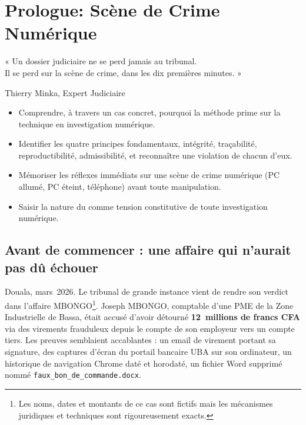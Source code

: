 
\chapter{Prologue: Scène de Crime Numérique}
\label{chap:prologue}

\epigraph{%
    « Un dossier judiciaire ne se perd jamais au tribunal.\\
    Il se perd sur la scène de crime, dans les dix premières minutes. »%
}{Thierry Minka, Expert Judiciaire}


\begin{boxobjectifs}
\begin{itemize}
    \item Comprendre, à travers un cas concret, pourquoi la méthode prime
          sur la technique en investigation numérique.
    \item Identifier les quatre principes fondamentaux, intégrité,
          traçabilité, reproductibilité, admissibilité, et reconnaître
          une violation de chacun d'eux.
    \item Mémoriser les réflexes immédiats sur une scène de crime numérique
          (PC allumé, PC éteint, téléphone) avant toute manipulation.
    \item Saisir la nature du  comme tension
          constitutive de toute investigation numérique.
\end{itemize}
\end{boxobjectifs}

\bigskip

\section*{Avant de commencer : une affaire qui n'aurait pas dû échouer}

Douala, mars~2026. Le tribunal de grande instance vient de rendre son verdict
dans l'affaire MBONGO\footnote{Les noms, dates et montants de ce cas sont
fictifs mais les mécanismes juridiques et techniques sont rigoureusement
exacts.}. Joseph MBONGO, comptable d'une PME de la Zone Industrielle de
Bassa, était accusé d'avoir détourné \textbf{12~millions de francs CFA} via
des virements frauduleux depuis le compte de son employeur vers un compte
tiers. Les preuves semblaient accablantes : un email de virement portant sa
signature, des captures d'écran du portail bancaire UBA sur son ordinateur,
un historique de navigation Chrome daté et horodaté, un fichier Word supprimé
nommé \texttt{faux\_bon\_de\_commande.docx}.

